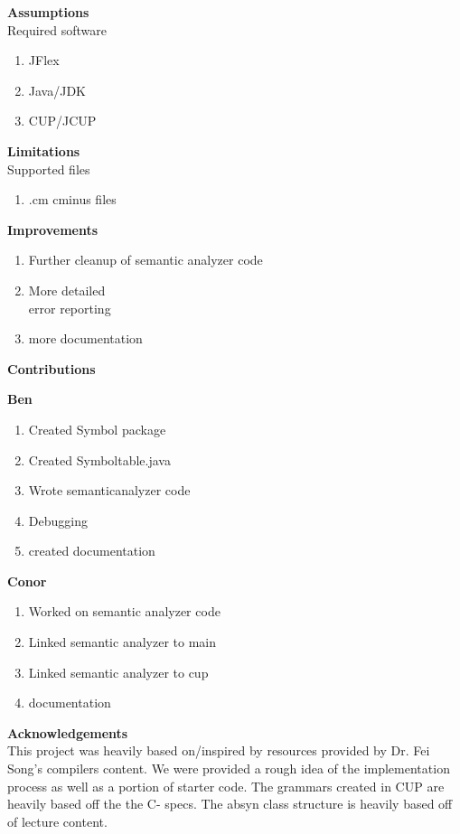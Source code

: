 \documentclass[12pt]{extarticle}
\begin{document}
\begin{multicols}{3}
    \textbf{Assumptions} \\
    Required software
    \begin{enumerate}
        \item JFlex
        \item Java/JDK
        \item CUP/JCUP
    \end{enumerate}
    \columnbreak
    \textbf{Limitations} \\
    Supported files
    \begin{enumerate}
        \item .cm cminus files
    \end{enumerate}
    \columnbreak
    \textbf{Improvements}
    \begin{enumerate}
        \item Further cleanup of semantic analyzer code
        \item More detailed \\error reporting
        \item more documentation
    \end{enumerate}
\end{multicols}


\textbf{Contributions}

\begin{multicols}{2}
\textbf{Ben}
\begin{enumerate}
    \item Created Symbol package
    \item Created Symboltable.java
    \item Wrote semanticanalyzer code
    \item Debugging
    \item created documentation
\end{enumerate}
\columnbreak
\textbf{Conor}
\begin{enumerate}
    \item Worked on semantic analyzer code
    \item Linked semantic analyzer to main
    \item Linked semantic analyzer to cup
    \item documentation
\end{enumerate}
\end{multicols}

\vspace{0.5cm}

\textbf{Acknowledgements} \\
This project was heavily based on/inspired by resources provided by Dr. Fei Song's compilers content. We were provided a rough idea of the implementation process as well as a portion of starter code. The grammars created in CUP are heavily based off the the C- specs. The absyn class structure is heavily based off of lecture content.
\end{document}
